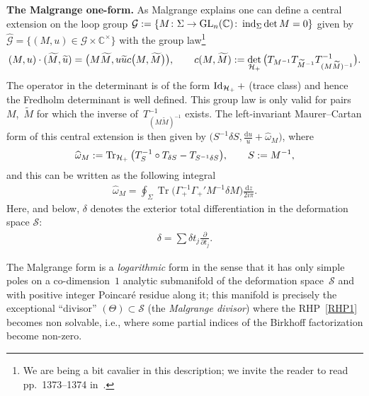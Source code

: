 \documentclass[pdftex]{sigma}
\numberwithin{equation}{section}
\def \ddz{ \frac {\d z}{2i\pi}}
\def\wt{\widetilde}
\def \G{\Gamma}
\def \pa{\partial}
\def\C{{\mathbb C}}
\def\wh{\widehat}
\def\H{{\cal H}}
\def\d{\mathrm d}
\begin{document}
{\bf The Malgrange one-form.}
As Malgrange explains \cite{Malgrange:Deformations}
one can def\/ine a central extension on the loop group $\mathcal G:= \{M\colon \Sigma \to {\rm GL}_n(\C)\colon \operatorname{ind}_{\Sigma} \det M=0\}$ given by $ \wh {\mathcal G} =\{ (M,u)\in \mathcal G \times \C^\times\}$ with the group law\footnote{We are being a bit cavalier in this description; we invite the reader to read pp.~1373--1374 in~\cite{Malgrange:Deformations}.}
\begin{gather*}
(M, u) \cdot (\wt M, \wt u) = \big (M \wt M, u \wt u c\big(M,\wt M\big)\big) ,\qquad c(M, \wt M):= \det_{\H_+} \big(T_{M^{-1}} T_{\wt M^{-1}} T^{-1}_{(M \wt M)^{-1}}\big).
\end{gather*}
The operator in the determinant is of the form $\operatorname{Id}_{\H_+} + $ (trace class) and hence the Fredholm determinant is well def\/ined. This group law is only valid for pairs~$M$,~$\wt M$ for which the inverse of~$T^{-1}_{(M \wt M)^{-1}}$ exists. The left-invariant Maurer--Cartan form of this central extension is then given by $\big(S^{-1}\delta S, \frac {\d u}u +\wh \omega_M\big)$, where
\begin{gather*}
\wh \omega_{M} := \operatorname{Tr}_{\H_+} \big( T_S^{-1} \circ T_{\delta S} - T_{S^{-1}\delta S} \big),\qquad S:= M^{-1},
\end{gather*}
and this can be written as the following integral
\begin{gather}\label{Mal1}
\wh \omega_M = \oint_{\Sigma} \operatorname{Tr} \big(\G_+^{-1} \G_+' M^{-1} \delta M\big) \ddz.
\end{gather}
Here, and below, $\delta$ denotes the exterior total dif\/ferentiation in the deformation space $\mathcal S$:
\begin{gather*}
\delta = \sum \delta t_j \frac {\pa }{\pa t_j}.
\end{gather*}

The Malgrange form is a {\em logarithmic} form in the sense that it has only simple poles on a co-dimension~$1$ analytic submanifold of the deformation space~$\mathcal S$ and with positive integer Poincar\'e residue along it; this manifold is precisely the exceptional ``divisor'' $(\Theta)\subset \mathcal S$ (the {\em Malgrange divisor}) where the RHP~\eqref{RHP1} becomes non solvable, i.e., where some partial indices of the Birkhof\/f factorization become non-zero.
\end{document}
